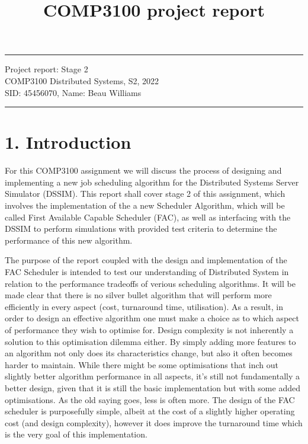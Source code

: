 \documentclass[a4paper]{article} %
\begin{document}

\title{COMP3100 project report} %
\fancyhead[C]{}
\hrule \medskip %
\begin{minipage}{1\textwidth} %
\centering 
\large %
Project report: Stage 2\\ %
COMP3100 Distributed Systems, S2, 2022\\
\normalsize %
SID: 45456070, Name: Beau Williams
\end{minipage}
\medskip\hrule %
\bigskip


\section*{1. Introduction}
For this COMP3100 assignment we will discuss the process of designing and implementing a new job scheduling algorithm for the Distributed Systems Server Simulator (DSSIM)\cite{dssim}. This report shall cover stage 2 of this assignment, which involves the implementation of the a new Scheduler Algorithm, which will be called First Available Capable Scheduler (FAC), as well as interfacing with the DSSIM to perform simulations with provided test criteria to determine the performance of this new algorithm.
\newline

The purpose of the report coupled with the design and implementation of the FAC Scheduler is intended to test our understanding of Distributed System in relation to the performance tradeoffs of verious scheduling algorithms. It will be made clear that there is no silver bullet algorithm that will perform more efficiently in every aspect (cost, turnaround time, utilisation). As a result, in order to design an effective algorithm one must make a choice as to which aspect of performance they wish to optimise for. Design complexity is not inherently a solution to this optimisation dilemma either. By simply adding more features to an algorithm not only does its characteristics change, but also it often becomes harder to maintain. While there might be some optimisations that inch out slightly better algorithm performance in all aspects, it's still not fundamentally a better design, given that it is still the basic implementation but with some added optimisations. As the old saying goes, less is often more. The design of the FAC scheduler is purposefully simple, albeit at the cost of a slightly higher operating cost (and design complexity), however it does improve the turnaround time which is the very goal of this implementation.
\newline
\end{document}
